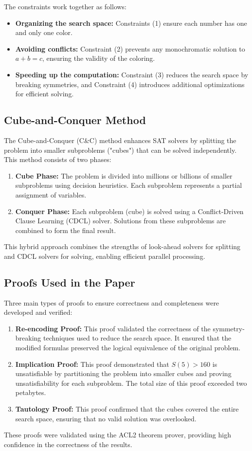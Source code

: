 \documentclass{article}
\begin{document}
The constraints work together as follows:
\begin{itemize}
    \item \textbf{Organizing the search space:} Constraints (1) ensure each number has one and only one color.
    \item \textbf{Avoiding conflicts:} Constraint (2) prevents any monochromatic solution to \( a + b = c \), ensuring the validity of the coloring.
    \item \textbf{Speeding up the computation:} Constraint (3) reduces the search space by breaking symmetries, and Constraint (4) introduces additional optimizations for efficient solving.
\end{itemize}

\subsection{Cube-and-Conquer Method}
The Cube-and-Conquer (C&C) method enhances SAT solvers by splitting the problem into smaller subproblems ("cubes") that can be solved independently. This method consists of two phases:
\begin{enumerate}
    \item \textbf{Cube Phase:} The problem is divided into millions or billions of smaller subproblems using decision heuristics. Each subproblem represents a partial assignment of variables.
    \item \textbf{Conquer Phase:} Each subproblem (cube) is solved using a Conflict-Driven Clause Learning (CDCL) solver. Solutions from these subproblems are combined to form the final result.
\end{enumerate}

This hybrid approach combines the strengths of look-ahead solvers for splitting and CDCL solvers for solving, enabling efficient parallel processing.

\subsection{Proofs Used in the Paper}
Three main types of proofs to ensure correctness and completeness were developed and verified: 
\begin{enumerate}
    \item \textbf{Re-encoding Proof:} This proof validated the correctness of the symmetry-breaking techniques used to reduce the search space. It ensured that the modified formulas preserved the logical equivalence of the original problem.

    \item \textbf{Implication Proof:} This proof demonstrated that \( S(5) > 160 \) is unsatisfiable by partitioning the problem into smaller cubes and proving unsatisfiability for each subproblem. The total size of this proof exceeded two petabytes.

    \item \textbf{Tautology Proof:} This proof confirmed that the cubes covered the entire search space, ensuring that no valid solution was overlooked.
\end{enumerate}
These proofs were validated using the ACL2 theorem prover, providing high confidence in the correctness of the results.
\end{document}
